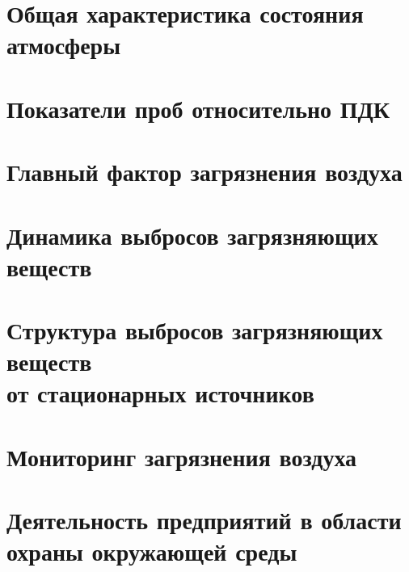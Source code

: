 

\section{Общая характеристика состояния атмосферы}
\begin{frame}{\insertsectionhead}
\end{frame}

\section{Показатели проб относительно ПДК}
\begin{frame}{\insertsectionhead}
\end{frame}

\section{Главный фактор загрязнения воздуха}
\begin{frame}{\insertsectionhead}
\end{frame}

\section{Динамика выбросов загрязняющих веществ}
\begin{frame}{\insertsectionhead}
\end{frame}

\section{Структура выбросов загрязняющих веществ \\ от
стационарных источников}
\begin{frame}{\insertsectionhead}
\end{frame}

\section{Мониторинг загрязнения воздуха}
\begin{frame}{\insertsectionhead}
\end{frame}

\section{Деятельность предприятий в области \\ охраны окружающей среды}
\begin{frame}{\insertsectionhead}
\end{frame}






